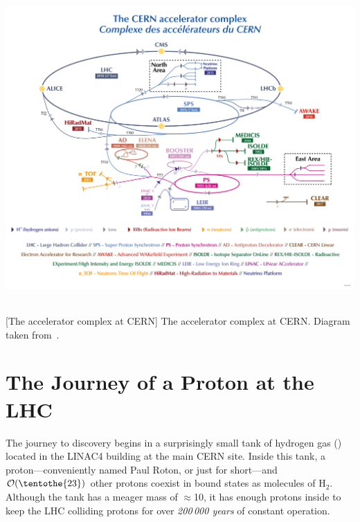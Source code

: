 \begin{multiFigure}
    \centering
    \includegraphics[height=12.5cm]{figures/lhc/cern_complex.png}
        [The accelerator complex at CERN]
        {The accelerator complex at CERN. Diagram taken from~\cite{PhysRevLett.114.191803}.%
        }
    \label{fig:lhc_complex}
\end{multiFigure}

\section{The Journey of a Proton at the LHC}
The journey to discovery begins in a surprisingly small tank of hydrogen gas (\htwo) located in the LINAC4 building at the main CERN site.
Inside this tank, a proton---conveniently named Paul Roton, or just \pname for short---and $\mathcal{O}(\tentothe{23})$ other protons
coexist in bound states as molecules of H$_2$.
Although the tank has a meager mass of 
$\approx$10\Kg,
it has enough protons inside to keep the LHC colliding protons for over \emph{200\,000 years} of constant operation.

